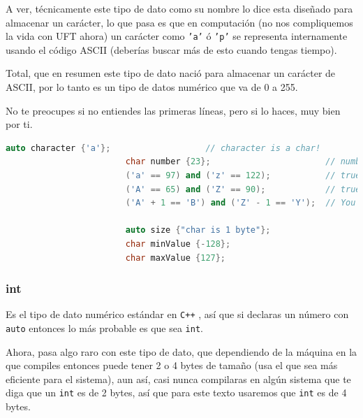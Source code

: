 \documentclass[12pt, fleqn]{report}                             %
\theoremstyle{break}                                            %
\newcommand \Cpp  {\texttt{C++} }                               %
\begin{document}
                    A ver, técnicamente este tipo de dato como su nombre lo dice esta diseñado para almacenar
                    un carácter, lo que pasa es que en computación (no nos compliquemos la vida con UFT ahora)
                    un carácter como \texttt{'a'} ó \texttt{'p'} se representa internamente usando el código
                    ASCII (deberías buscar más de esto cuando tengas tiempo).
                    
                    Total, que en resumen este tipo de dato nació para almacenar un carácter de ASCII, 
                    por lo tanto es un tipo de datos numérico que va de 0 a 255.

                    No te preocupes si no entiendes las primeras líneas, pero si lo haces, muy bien por ti.
                    \begin{lstlisting}[language=C++, gobble=20]
                        auto character {'a'};                   // character is a char!
                        char number {23};                       // number is a char!
                        ('a' == 97) and ('z' == 122);           // true: ASCII is numbers
                        ('A' == 65) and ('Z' == 90);            // true: ASCII is numbers
                        ('A' + 1 == 'B') and ('Z' - 1 == 'Y');  // You can do arithmetic

                        auto size {"char is 1 byte"};
                        char minValue {-128};
                        char maxValue {127};
                    \end{lstlisting}


                \clearpage
                \subsubsection{int}

                    Es el tipo de dato numérico estándar en \Cpp, así que si declaras un número
                    con \texttt{auto} entonces lo más probable es que sea \texttt{int}.

                    Ahora, pasa algo raro con este tipo de dato, que dependiendo de la máquina
                    en la que compiles entonces puede tener 2 o 4 bytes de tamaño (usa el que
                    sea más eficiente para el sistema), aun así, casi nunca compilaras en 
                    algún sistema que te diga que un \texttt{int} es de 2 bytes, así que para
                    este texto usaremos que \texttt{int} es de 4 bytes.
                    
\end{document}
